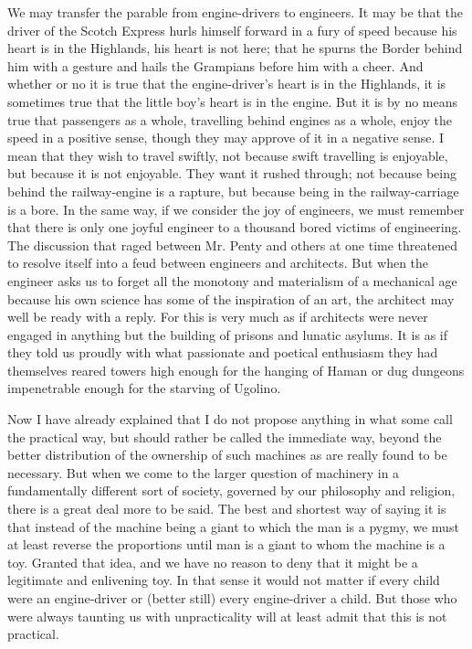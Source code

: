 \documentclass{book}
\begin{document}
We may transfer the parable from engine-drivers to engineers. It may be that the driver of the Scotch Express hurls himself forward in a fury of speed because his heart is in the Highlands, his heart is not here; that he spurns the Border behind him with a gesture and hails the Grampians before him with a cheer. And whether or no it is true that the engine-driver’s heart is in the Highlands, it is sometimes true that the little boy’s heart is in the engine. But it is by no means true that passengers as a whole, travelling behind engines as a whole, enjoy the speed in a positive sense, though they may approve of it in a negative sense. I mean that they wish to travel swiftly, not because swift travelling is enjoyable, but because it is not enjoyable. They want it rushed through; not because being behind the railway-engine is a rapture, but because being in the railway-carriage is a bore. In the same way, if we consider the joy of engineers, we must remember that there is only one joyful engineer to a thousand bored victims of engineering. The discussion that raged between Mr. Penty and others at one time threatened to resolve itself into a feud between engineers and architects. But when the engineer asks us to forget all the monotony and materialism of a mechanical age because his own science has some of the inspiration of an art, the architect may well be ready with a reply. For this is very much as if architects were never engaged in anything but the building of prisons and lunatic asylums. It is as if they told us proudly with what passionate and poetical enthusiasm they had themselves reared towers high enough for the hanging of Haman or dug dungeons impenetrable enough for the starving of Ugolino.

Now I have already explained that I do not propose anything in what some call the practical way, but should rather be called the immediate way, beyond the better distribution of the ownership of such machines as are really found to be necessary. But when we come to the larger question of machinery in a fundamentally different sort of society, governed by our philosophy and religion, there is a great deal more to be said. The best and shortest way of saying it is that instead of the machine being a giant to which the man is a pygmy, we must at least reverse the proportions until man is a giant to whom the machine is a toy. Granted that idea, and we have no reason to deny that it might be a legitimate and enlivening toy. In that sense it would not matter if every child were an engine-driver or (better still) every engine-driver a child. But those who were always taunting us with unpracticality will at least admit that this is not practical.
\end{document}
